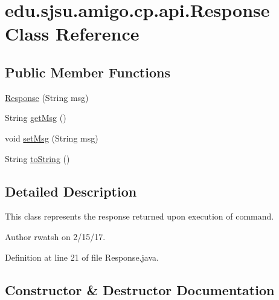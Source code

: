 \hypertarget{classedu_1_1sjsu_1_1amigo_1_1cp_1_1api_1_1_response}{}\section{edu.\+sjsu.\+amigo.\+cp.\+api.\+Response Class Reference}
\label{classedu_1_1sjsu_1_1amigo_1_1cp_1_1api_1_1_response}
\subsection*{Public Member Functions}
\begin{DoxyCompactItemize}
\item 
\hyperlink{classedu_1_1sjsu_1_1amigo_1_1cp_1_1api_1_1_response_ae1a47de9121f8ca4f0c805f5ca8c495a}{Response} (String msg)
\item 
String \hyperlink{classedu_1_1sjsu_1_1amigo_1_1cp_1_1api_1_1_response_ac99ad923c8efd03440fe0e4a2320b729}{get\+Msg} ()
\item 
void \hyperlink{classedu_1_1sjsu_1_1amigo_1_1cp_1_1api_1_1_response_ab662e711541d25f75f09b57666d72188}{set\+Msg} (String msg)
\item 
String \hyperlink{classedu_1_1sjsu_1_1amigo_1_1cp_1_1api_1_1_response_a19b9978ae39ca96ccdc8ec6fe3faf7e2}{to\+String} ()
\end{DoxyCompactItemize}


\subsection{Detailed Description}
This class represents the response returned upon execution of command.

\begin{DoxyAuthor}{Author}
rwatsh on 2/15/17. 
\end{DoxyAuthor}


Definition at line 21 of file Response.\+java.



\subsection{Constructor \& Destructor Documentation}
\mbox{\label{classedu_1_1sjsu_1_1amigo_1_1cp_1_1api_1_1_response_ae1a47de9121f8ca4f0c805f5ca8c495a}} 
